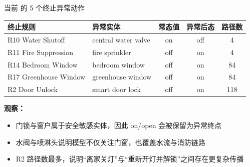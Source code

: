 \documentclass[aspectratio=169,10pt]{beamer}
\newcommand{\HL}[1]{\textcolor{emphasis}{#1}}
\newcommand{\USTG}{\text{USTG}}
\begin{document}
\begin{frame}{当前 \USTG 的 5 个终止异常动作}
\begin{center}
\scriptsize
\begin{tabular}{>{\RaggedRight\arraybackslash}p{} >{\RaggedRight\arraybackslash}p{} c c c}
\toprule
终止规则 & 异常实体 & 常态值 & 异常后态 & 路径数 \\
\midrule
R10 Water Shutoff & central water valve & on & off & 4 \\
R11 Fire Suppression & fire sprinkler & off & on & 4 \\
R14 Bedroom Window & bedroom window & off & on & 84 \\
R17 Greenhouse Window & greenhouse window & off & on & 84 \\
R2 Door Unlock & smart door lock & off & on & 118 \\
\bottomrule
\end{tabular}
\end{center}

\vspace{4pt}
\textbf{观察：}
\begin{itemize}
  \item 门锁与窗户属于\HL{安全敏感实体}，因此 on/open 会被保留为异常终点
  \item 水阀与喷淋头说明模型不仅关注门窗，也覆盖水流与消防链路
  \item R2 路径数最多，说明“离家关灯”与“重新开灯并解锁”之间存在更复杂传播
\end{itemize}
\end{frame}
\end{document}
